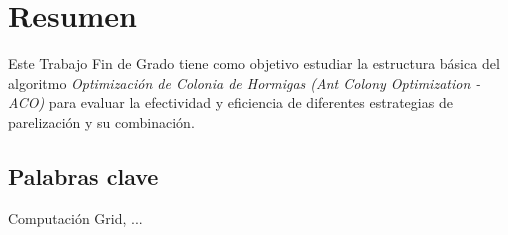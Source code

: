 \chapter*{Resumen}

Este Trabajo Fin de Grado tiene como objetivo estudiar la estructura básica del algoritmo {\em Optimización de Colonia de Hormigas (Ant Colony Optimization - ACO) }para evaluar la efectividad y eficiencia de diferentes estrategias de parelización y su combinación.

\section*{Palabras clave}
Computaci\'on Grid, ...
